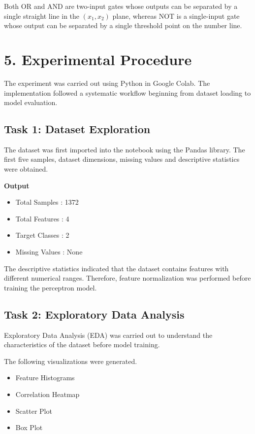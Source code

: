 \documentclass[11pt,a4paper]{article}
\begin{document}
Both OR and AND are two-input gates whose outputs can be separated by a single straight line in the $(x_1,x_2)$ plane, whereas NOT is a single-input gate whose output can be separated by a single threshold point on the number line.
\section*{5. Experimental Procedure}

The experiment was carried out using Python in Google Colab. The implementation followed a systematic workflow beginning from dataset loading to model evaluation.


\subsection*{Task 1: Dataset Exploration}

The dataset was first imported into the notebook using the Pandas library. The first five samples, dataset dimensions, missing values and descriptive statistics were obtained.

\textbf{Output}

\begin{itemize}
\item Total Samples : 1372
\item Total Features : 4
\item Target Classes : 2
\item Missing Values : None
\end{itemize}

\vspace{0.3cm}

The descriptive statistics indicated that the dataset contains features with different numerical ranges. Therefore, feature normalization was performed before training the perceptron model.



\subsection*{Task 2: Exploratory Data Analysis}

Exploratory Data Analysis (EDA) was carried out to understand the characteristics of the dataset before model training.

The following visualizations were generated.

\begin{itemize}
\item Feature Histograms
\item Correlation Heatmap
\item Scatter Plot
\item Box Plot
\end{itemize}
\end{document}
